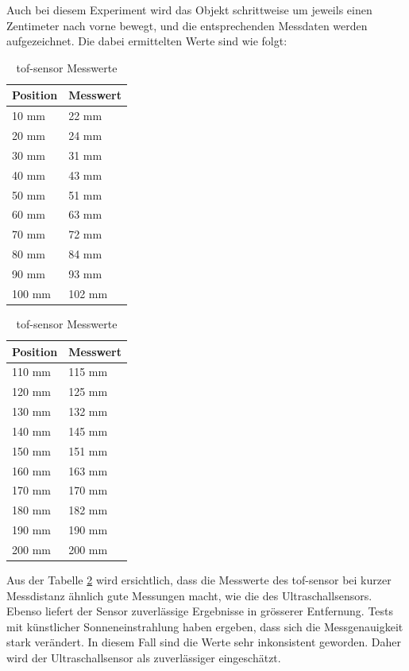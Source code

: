 \documentclass[../main.tex]{subfiles}
\begin{document}
Auch bei diesem Experiment wird das Objekt schrittweise um jeweils einen Zentimeter nach vorne bewegt, und die entsprechenden Messdaten werden aufgezeichnet. Die dabei ermittelten Werte sind wie folgt:
\begin{table}[H]
\centering
\begin{minipage}{0.45\textwidth}
\centering
\begin{tabular}{@{}ll@{}}
\toprule
\textbf{Position} & \textbf{Messwert} \\
\midrule
10 mm  & 22 mm  \\
20 mm  & 24 mm  \\
30 mm  & 31 mm  \\
40 mm  & 43 mm  \\
50 mm  & 51 mm  \\
60 mm  & 63 mm  \\
70 mm  & 72 mm  \\
80 mm  & 84 mm  \\
90 mm  & 93 mm  \\
100 mm & 102 mm \\
\bottomrule
\end{tabular}
\end{minipage}%
\hspace{0.05\textwidth} %
\begin{minipage}{0.45\textwidth}
\centering
\begin{tabular}{@{}ll@{}}
\toprule
\textbf{Position} & \textbf{Messwert} \\
\midrule
110 mm & 115 mm \\
120 mm & 125 mm \\
130 mm & 132 mm \\
140 mm & 145 mm \\
150 mm & 151 mm \\
160 mm & 163 mm \\
170 mm & 170 mm \\
180 mm & 182 mm \\
190 mm & 190 mm \\
200 mm & 200 mm \\
\bottomrule
\end{tabular}
\end{minipage}
\caption{\acrshort{tof-sensor} Messwerte}
\label{tab:TOFMD}
\end{table}

Aus der Tabelle \ref{tab:TOFMD} wird ersichtlich, dass die Messwerte des \acrshort{tof-sensor} bei kurzer Messdistanz ähnlich gute Messungen macht, wie die des Ultraschallsensors. Ebenso liefert der Sensor zuverlässige Ergebnisse in grösserer Entfernung. Tests mit künstlicher Sonneneinstrahlung haben ergeben, dass sich die Messgenauigkeit stark verändert. In diesem Fall sind die Werte sehr inkonsistent geworden. Daher wird der Ultraschallsensor als zuverlässiger eingeschätzt.
\end{document}
